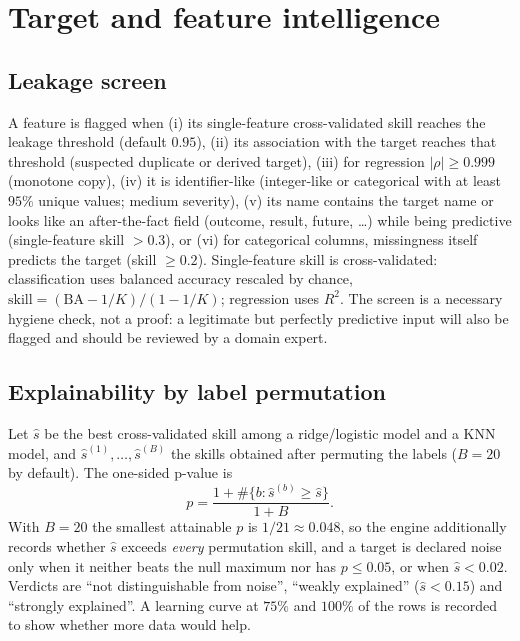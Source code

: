 \documentclass[conference]{IEEEtran}
\begin{document}
\section{Target and feature intelligence}\label{sec:target}
\subsection{Leakage screen}
A feature is flagged when (i) its single-feature cross-validated skill reaches the leakage threshold (default $0.95$), (ii) its association with the target reaches that threshold (suspected duplicate or derived target), (iii) for regression $|\rho|\ge0.999$ (monotone copy), (iv) it is identifier-like (integer-like or categorical with at least $95\%$ unique values; medium severity), (v) its name contains the target name or looks like an after-the-fact field (outcome, result, future, \ldots) while being predictive (single-feature skill $>0.3$), or (vi) for categorical columns, missingness itself predicts the target (skill $\ge0.2$). Single-feature skill is cross-validated: classification uses balanced accuracy rescaled by chance, $\text{skill}=(\mathrm{BA}-1/K)/(1-1/K)$; regression uses $R^2$. The screen is a necessary hygiene check, not a proof: a legitimate but perfectly predictive input will also be flagged and should be reviewed by a domain expert.

\subsection{Explainability by label permutation}
Let $\hat s$ be the best cross-validated skill among a ridge/logistic model and a KNN model, and $\hat s^{(1)},\ldots,\hat s^{(B)}$ the skills obtained after permuting the labels ($B=20$ by default). The one-sided p-value is
\begin{equation}p=\frac{1+\#\{b:\hat s^{(b)}\ge\hat s\}}{1+B}.\end{equation}
With $B=20$ the smallest attainable $p$ is $1/21\approx0.048$, so the engine additionally records whether $\hat s$ exceeds \emph{every} permutation skill, and a target is declared noise only when it neither beats the null maximum nor has $p\le0.05$, or when $\hat s<0.02$. Verdicts are ``not distinguishable from noise'', ``weakly explained'' ($\hat s<0.15$) and ``strongly explained''. A learning curve at $75\%$ and $100\%$ of the rows is recorded to show whether more data would help.
\end{document}
